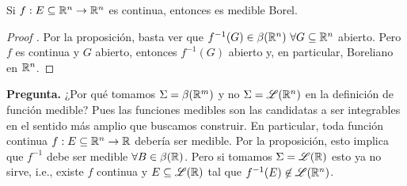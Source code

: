 \begin{corollary}
	Si $f : E \subseteq \mathbb{R}^n \to \mathbb{R}^n$ es continua, entonces es medible Borel.
\end{corollary}
\begin{proof}[Proof ]
	Por la proposición, basta ver que $f^{-1}(G) \in \beta(\mathbb{R}^n) \ \forall G \subseteq \mathbb{R}^n$ abierto. Pero $f$ es continua y $G$ abierto, entonces $f^{-1}(G)$ abierto y, en particular, Boreliano en $\mathbb{R}^n$.
\end{proof}

\textbf{Pregunta.} ¿Por qué tomamos $\Sigma = \beta(\mathbb{R}^m)$ y no $\Sigma = \mathscr{L}(\mathbb{R}^n)$ en la definición de función medible? Pues las funciones medibles son las candidatas a ser integrables en el sentido más amplio que buscamos construir. En particular, toda función continua $f : E \subseteq \mathbb{R}^n \to \mathbb{R}$ debería ser medible. Por la proposición, esto implica que $f^{-1}$ debe ser medible $\forall B \in \beta(\mathbb{R})$. Pero si tomamos $\Sigma = \mathscr{L}(\mathbb{R})$ esto ya no sirve, i.e., existe $f$ continua y $E \subseteq \mathscr{L}(\mathbb{R})$ tal que $f^{-1}(E) \not\in \mathscr{L}(\mathbb{R}^n)$.
